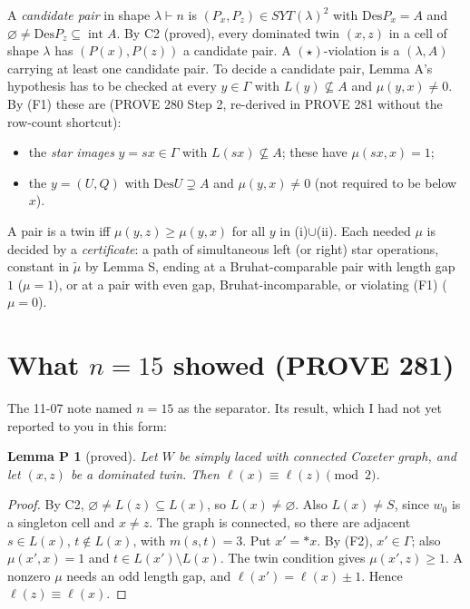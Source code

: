 \documentclass[11pt]{amsart}
\newcommand{\gr}[1]{\textsf{#1}}
\newtheorem*{lemmaP}{Lemma P}
\theoremstyle{definition}
\theoremstyle{remark}
\newcommand{\Des}{\mathrm{Des}}
\newcommand{\intr}{\operatorname{int}}
\newcommand{\tmu}{\tilde\mu}
\begin{document}
A \emph{candidate pair} in shape $\lambda\vdash n$ is $(P_x,P_z)\in SYT(\lambda)^2$ with $\Des P_x=A$ and $\varnothing\ne\Des P_z\subseteq\intr A$. By C2 (\gr{proved}), every dominated twin $(x,z)$ in a cell of shape $\lambda$ has $(P(x),P(z))$ a candidate pair. A $(\star)$-violation is a $(\lambda,A)$ carrying at least one candidate pair. To decide a candidate pair, Lemma A's hypothesis has to be checked at every $y\in\Gamma$ with $L(y)\not\subseteq A$ and $\mu(y,x)\ne0$. By (F1) these are (PROVE 280 Step 2, re-derived in PROVE 281 without the row-count shortcut):
\begin{itemize}[leftmargin=*,itemsep=1pt]
\item[(i)] the \emph{star images} $y=sx\in\Gamma$ with $L(sx)\not\subseteq A$; these have $\mu(sx,x)=1$;
\item[(ii)] the $y=(U,Q)$ with $\Des U\supsetneq A$ and $\mu(y,x)\ne0$ (not required to be below $x$).
\end{itemize}
A pair is a twin iff $\mu(y,z)\ge\mu(y,x)$ for all $y$ in (i)$\cup$(ii). Each needed $\mu$ is decided by a \emph{certificate}: a path of simultaneous left (or right) star operations, constant in $\tmu$ by Lemma S, ending at a Bruhat-comparable pair with length gap $1$ ($\mu=1$), or at a pair with even gap, Bruhat-incomparable, or violating (F1) ($\mu=0$).

\section{What \texorpdfstring{$n=15$}{n=15} showed (PROVE 281)}

The 11-07 note named $n=15$ as the separator. Its result, which I had not yet reported to you in this form:

\begin{lemmaP}[\gr{proved}]
Let $W$ be simply laced with connected Coxeter graph, and let $(x,z)$ be a dominated twin. Then $\ell(x)\equiv\ell(z)\pmod 2$.
\end{lemmaP}

\begin{proof}
By C2, $\varnothing\ne L(z)\subseteq L(x)$, so $L(x)\ne\varnothing$. Also $L(x)\ne S$, since $w_0$ is a singleton cell and $x\ne z$. The graph is connected, so there are adjacent $s\in L(x)$, $t\notin L(x)$, with $m(s,t)=3$. Put $x'={*x}$. By (F2), $x'\in\Gamma$; also $\mu(x',x)=1$ and $t\in L(x')\setminus L(x)$. The twin condition gives $\mu(x',z)\ge1$. A nonzero $\mu$ needs an odd length gap, and $\ell(x')=\ell(x)\pm1$. Hence $\ell(z)\equiv\ell(x)$.
\end{proof}
\end{document}
